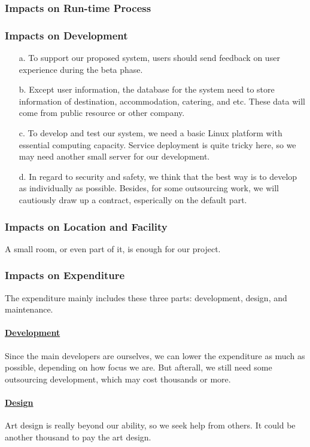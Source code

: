 \documentclass[10pt]{article}
\begin{document}
\subsubsection{Impacts on Run-time Process}

\subsubsection{Impacts on Development}
\begin{itemize}
  \item[a.] To support our proposed system, users should send feedback on user experience during the beta phase.
  \item[b.] Except user information, the database for the system need to store information of destination, accommodation, catering, and etc. These data will come from public resource or other company.
  \item[c.] To develop and test our system, we need a basic Linux platform with essential computing capacity. Service deployment is quite tricky here, so we may need another small server for our development.
  \item[d.] In regard to security and safety, we think that the best way is to develop as individually as possible. Besides, for some outsourcing work, we will cautiously draw up a contract, esperically on the default part. 
\end{itemize}

\subsubsection{Impacts on Location and Facility}
A small room, or even part of it, is enough for our project.

\subsubsection{Impacts on Expenditure}
The expenditure mainly includes these three parts: development, design, and maintenance.

\paragraph{\underline{Development}}
Since the main developers are ourselves, we can lower the expenditure as much as possible, depending on how focus we are. But afterall, we still need some outsourcing development, which may cost thousands or more.

\paragraph{\underline{Design}}
Art design is really beyond our ability, so we seek help from others. It could be another thousand to pay the art design.
\end{document}
